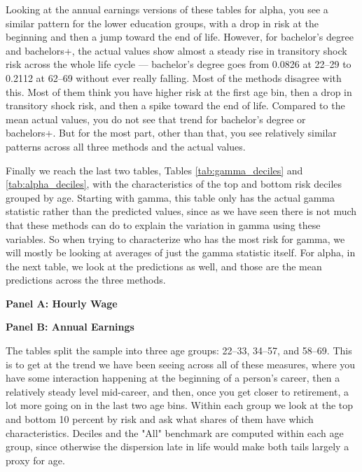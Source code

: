 \documentclass[12pt]{article}
\begin{document}
\begin{onehalfspace}
Looking at the annual earnings versions of these tables for alpha, you see a similar pattern for the lower education groups, with a drop in risk at the beginning and then a jump toward the end of life. However, for bachelor's degree and bachelors+, the actual values show almost a steady rise in transitory shock risk across the whole life cycle --- bachelor's degree goes from 0.0826 at 22--29 to 0.2112 at 62--69 without ever really falling. Most of the methods disagree with this. Most of them think you have higher risk at the first age bin, then a drop in transitory shock risk, and then a spike toward the end of life. Compared to the mean actual values, you do not see that trend for bachelor's degree or bachelors+. But for the most part, other than that, you see relatively similar patterns across all three methods and the actual values.

Finally we reach the last two tables, Tables \ref{tab:gamma_deciles} and \ref{tab:alpha_deciles}, with the characteristics of the top and bottom risk deciles grouped by age. Starting with gamma, this table only has the actual gamma statistic rather than the predicted values, since as we have seen there is not much that these methods can do to explain the variation in gamma using these variables. So when trying to characterize who has the most risk for gamma, we will mostly be looking at averages of just the gamma statistic itself. For alpha, in the next table, we look at the predictions as well, and those are the mean predictions across the three methods.

\begin{table}[H]
    \centering
    \caption{Characteristics of Top and Bottom Risk Deciles by Age, Gamma (Sorted by Actual Risk; Percent Shares)}
    \label{tab:gamma_deciles}
    \textbf{Panel A: Hourly Wage}\\[4pt]
    \resizebox*{!}{0.41\textheight}{%
        
    }

    \vspace{10pt}

    \textbf{Panel B: Annual Earnings}\\[4pt]
    \resizebox*{!}{0.41\textheight}{%
        
    }
\end{table}

The tables split the sample into three age groups: 22--33, 34--57, and 58--69. This is to get at the trend we have been seeing across all of these measures, where you have some interaction happening at the beginning of a person's career, then a relatively steady level mid-career, and then, once you get closer to retirement, a lot more going on in the last two age bins. Within each group we look at the top and bottom 10 percent by risk and ask what shares of them have which characteristics. Deciles and the "All" benchmark are computed within each age group, since otherwise the dispersion late in life would make both tails largely a proxy for age.


\end{onehalfspace}
\end{document}
